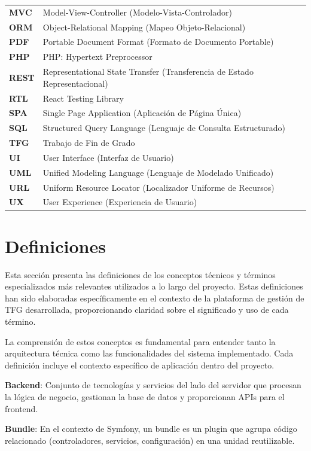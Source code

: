 \documentclass[12pt,a4paper,oneside]{report}
\begin{document}
\begin{longtable}[]{@{}
  >{\raggedright\arraybackslash}p{}
  >{\raggedright\arraybackslash}p{}@{}}
\textbf{MVC} & Model-View-Controller (Modelo-Vista-Controlador) \\
\textbf{ORM} & Object-Relational Mapping (Mapeo Objeto-Relacional) \\
\textbf{PDF} & Portable Document Format (Formato de Documento
Portable) \\
\textbf{PHP} & PHP: Hypertext Preprocessor \\
\textbf{REST} & Representational State Transfer (Transferencia de Estado
Representacional) \\
\textbf{RTL} & React Testing Library \\
\textbf{SPA} & Single Page Application (Aplicación de Página Única) \\
\textbf{SQL} & Structured Query Language (Lenguaje de Consulta
Estructurado) \\
\textbf{TFG} & Trabajo de Fin de Grado \\
\textbf{UI} & User Interface (Interfaz de Usuario) \\
\textbf{UML} & Unified Modeling Language (Lenguaje de Modelado
Unificado) \\
\textbf{URL} & Uniform Resource Locator (Localizador Uniforme de
Recursos) \\
\textbf{UX} & User Experience (Experiencia de Usuario) \\
\end{longtable}

\section{Definiciones}\label{definiciones}

Esta sección presenta las definiciones de los conceptos técnicos y
términos especializados más relevantes utilizados a lo largo del
proyecto. Estas definiciones han sido elaboradas específicamente en el
contexto de la plataforma de gestión de TFG desarrollada, proporcionando
claridad sobre el significado y uso de cada término.

La comprensión de estos conceptos es fundamental para entender tanto la
arquitectura técnica como las funcionalidades del sistema implementado.
Cada definición incluye el contexto específico de aplicación dentro del
proyecto.

\textbf{Backend}: Conjunto de tecnologías y servicios del lado del
servidor que procesan la lógica de negocio, gestionan la base de datos y
proporcionan APIs para el frontend.

\textbf{Bundle}: En el contexto de Symfony, un bundle es un plugin que
agrupa código relacionado (controladores, servicios, configuración) en
una unidad reutilizable.
\end{document}

